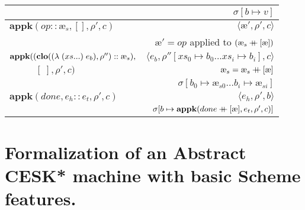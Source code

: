 \documentclass[12pt,draft]{article}
\newcommand\mdoubleplus{\ensuremath{\mathbin{+\mkern-9mu+}}}
\newcommand\mae{\ensuremath{\text{\ae}}}
\begin{document}
\begin{center}
\begin{tabular}{@{}l | r@{}}
& $ \sigma[b \mapsto v] $ \\
\hline
$ \textbf{appk}(op :: \mae_s , [] , \rho' , c) $
& $\langle \mae' , \rho' , c \rangle$ \\
& $ \mae' = op $ applied to $(\mae_s \mdoubleplus [\mae])$ \\
\hline
$ \textbf{appk}((\textbf{clo}(\lamsyn{xs}{e_b} , \rho'') :: \mae_s), $
& $\langle e_b , \rho''[xs_0 \mapsto b_0 ... xs_i \mapsto b_i] , c \rangle$ \\
$\;\;\;\;\;\;\;\;\;\;  [\;] , \rho' , c) $
& $ \mae_s = \mae_s \mdoubleplus [\mae] $ \\
& $ \sigma[b_0 \mapsto \mae_{s0} ... b_i \mapsto \mae_{si}] $  \\
\hline
$ \textbf{appk}(done, e_h::e_t , \rho' , c) $
& $\langle e_h , \rho' , b \rangle$ \\
& $ \sigma[b \mapsto \textbf{appk}(done \mdoubleplus [\mae] , e_t , \rho' , c)] $ \\
\hline
\end{tabular}
\end{center}







\newpage



\section{Formalization of an Abstract CESK* machine with basic Scheme features.}
\end{document}
